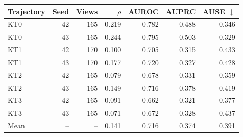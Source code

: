 \begin{tabular}{lrrrrrr}
\toprule
Trajectory & Seed & Views & $\rho$ & AUROC & AUPRC & AUSE $\downarrow$ \\
\midrule
KT0 & 42 & 165 & 0.219 & 0.782 & 0.488 & 0.346 \\
KT0 & 43 & 165 & 0.244 & 0.795 & 0.503 & 0.329 \\
KT1 & 42 & 170 & 0.100 & 0.705 & 0.315 & 0.433 \\
KT1 & 43 & 170 & 0.177 & 0.720 & 0.327 & 0.428 \\
KT2 & 42 & 165 & 0.079 & 0.678 & 0.331 & 0.359 \\
KT2 & 43 & 165 & 0.149 & 0.716 & 0.378 & 0.419 \\
KT3 & 42 & 165 & 0.091 & 0.662 & 0.321 & 0.377 \\
KT3 & 43 & 165 & 0.071 & 0.672 & 0.328 & 0.437 \\
\midrule
Mean & -- & -- & 0.141 & 0.716 & 0.374 & 0.391 \\
\bottomrule
\end{tabular}
